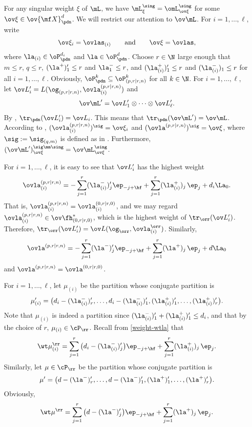 \documentclass[11pt, reqno]{amsart}
\theoremstyle{definition}
\theoremstyle{remark}
\numberwithin{equation}{section}
\begin{document}
For any singular weight $\xi$ of $\mL$, we have $\mL^\sing_{\xi}=\omL^\sing_{\ov\xi}$ for some $\ov\xi  \in \ov {\mf X}^{d}_\pdn$.
We will restrict our attention to $\ov\mL$.
For $i=1,\ldots,\ell$, write
$$
\ov\xi_i=\ovlas_{(i)} \qquad \text{and} \qquad  \ov\xi=\ovlas,
$$
where $\la_{(i)}\in \oP^{d_i}_\pdn$ and $\la\in \oP^d_\pdn$.
%
Choose $r \in \N$ large enough that $m\le r$, $q\le r$, $(\la^+)^\prime_1 \le r$ and $\la^-_1 \le r$, and  $(\la_{(i)}^+)^\prime_1 \le r$ and $(\la_{(i)}^-)_1 \le r$ for all $i=1, \ldots, \ell$.
Obviously, $\oP^k_\pdn \subseteq \oP^k_{(p, r|r, n)}$ for all $k \in \N$.
For $i=1,\ldots,\ell$, let $\ov L^\prime_i=L(\og_{(p, r|r, n)}, \ovla_{(i)}^{(p, r|r, n)})$ and
$$
\ov\mL^\prime=\ov L^\prime_1\otimes \cdots \otimes\ov L^\prime_\ell.
$$
By , $\tr_\pdn(\ov L^\prime_i)= \ov L_i$.
This means that $\tr_\pdn(\ov\mL^\prime)=\ov\mL$.
According to , $(\ovla_{(i)}^{(p, r|r, n)})^\sig=\ov\xi_i$ and $(\ovla^{(p, r|r, n)})^\sig=\ov\xi$, where $\sig:=\sig_{(q,m)}$ is defined as in .
Furthermore, $(\ov\mL^\prime)_{\ov\xi}^{\sig\mm\sing}=\ov\mL_{\ov\xi}^\sing$.


For $i=1,\ldots,\ell$, it is easy to see that $\ov L^\prime_i$ has the highest weight
$$
 \ovla_{(i)}^{(p, r|r, n)}=- \sum_{j=1}^{r} (\la^{-}_{(i)})^\prime_{j} \ep_{-j+\hf}   +\sum_{j=1}^r (\la^{+}_{(i)} )_j\, \ep_j+d_i\La_0.
$$
That is, $ \ovla_{(i)}^{(p, r|r, n)}= \ovla_{(i)}^{(0, r|r, 0)}$, and we may regard $\ovla_{(i)}^{(p, r|r, n)} \in \ov\fh^{*}_ {(0, r|r, 0)}$, which is the highest weight of $\tr_\orr(\ov L^\prime_i)$.
Therefore, $\tr_\orr(\ov L^\prime_i)=\ov L(\og_\orr,\ovla_{(i)}^\orr)$.
Similarly,
$$
 \ovla^{(p, r|r, n)}=- \sum_{j=1}^{r} (\la^{-})^\prime_{j} \ep_{-j+\hf}   +\sum_{j=1}^r (\la^{+} )_j\, \ep_j+d \La_0
$$
and $ \ovla^{(p, r|r, n)}= \ovla^{(0, r|r, 0)}$.


For $i=1,\ldots,\ell$, let $\mu_{(i)}$ be the partition whose conjugate partition is
$$
\mu_{(i)}^\prime=\big(d_i-(\la^{-}_{(i)})^\prime_r,\ldots,d_i-(\la^{-}_{(i)})^\prime_1, (\la^{+}_{(i)})^\prime_1,\ldots,(\la^{+}_{(i)})^\prime_r \big).
$$
Note that $\mu_{(i)}$ is indeed a partition since $(\la^{-}_{(i)})^\prime_1+ (\la^{+}_{(i)})^\prime_1 \le d_i$, and that by the choice of $r$, $\mu_{(i)} \in \cP_\rr$.
Recall from \eqref{weight-wtla} that
$$
\wt\mu_{(i)}^\rr= \sum_{j=1}^{r} \big(d_i-(\la^{-}_{(i)})^\prime_{j} \big) \ep_{-j+\hf}   +\sum_{j=1}^r (\la^{+}_{(i)} )_j\, \ep_j.
$$
Similarly, let $\mu \in \cP_\rr$ be the partition whose conjugate partition is
$$
\mu^\prime=\big(d-(\la^{-})^\prime_r,\ldots,d-(\la^{-})^\prime_1, (\la^{+})^\prime_1,\ldots,(\la^{+})^\prime_r \big).
$$
Obviously,
$$
\wt\mu^\rr= \sum_{j=1}^{r} \big(d-(\la^{-})^\prime_{j} \big) \ep_{-j+\hf}   +\sum_{j=1}^r (\la^{+} )_j\, \ep_j.
$$
\end{document}
